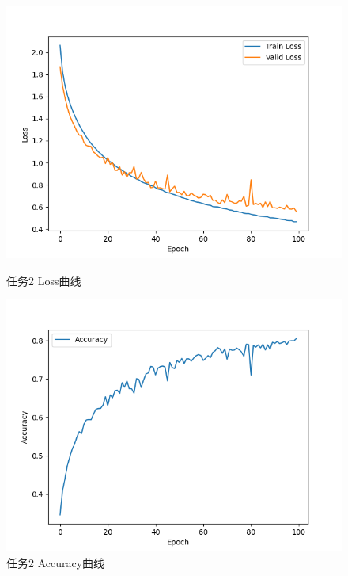 \documentclass{article}%
\begin{document}
\begin{figure}[H]
    \centering
    \begin{minipage}{0.49\linewidth}
        \centering
        \includegraphics[width=0.9\linewidth]{Loss_5.png}
        \caption{任务2 Loss曲线}
    \end{minipage}
    \begin{minipage}{0.49\linewidth}
        \centering
        \includegraphics[width=0.9\linewidth]{Acc_5.png}
        \caption{任务2 Accuracy曲线}
    \end{minipage}
\end{figure}
\end{document}
